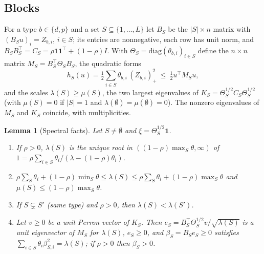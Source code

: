 \documentclass[11pt]{article}
\newtheorem{lemma}{Lemma}
\theoremstyle{definition}
\theoremstyle{remark}
\newcommand{\one}{\mathbf{1}}
\begin{document}
\subsection{Blocks}
For a type $b\in\{d,p\}$ and a set $S\subseteq\{1,\dots,L\}$ let $B_S$ be the $|S|\times n$
matrix with $(B_Su)_i=Z_{b,i}$, $i\in S$; its entries are nonnegative, each row has unit
norm, and $B_SB_S^\top=C_S=\rho\one\one^\top+(1-\rho)I$. With
$\Theta_S=\mathrm{diag}(\theta_{b,i})_{i\in S}$ define the $n\times n$ matrix
$M_S=B_S^\top\Theta_SB_S$, the quadratic forms
\[
h_S(u)=\tfrac12\sum_{i\in S}\theta_{b,i}\,(Z_{b,i})_+^2\ \le\ \tfrac12u^\top M_Su ,
\]
and the scales $\lambda(S)\ge\mu(S)$, the two largest eigenvalues of
$K_S=\Theta_S^{1/2}C_S\Theta_S^{1/2}$ (with $\mu(S)=0$ if $|S|=1$ and
$\lambda(\emptyset)=\mu(\emptyset)=0$). The nonzero eigenvalues of $M_S$ and $K_S$
coincide, with multiplicities.

\begin{lemma}[Spectral facts]\label{lem:spectral}
Let $S\ne\emptyset$ and $\xi=\Theta_S^{1/2}\one$.
\begin{enumerate}
\item[(a)] If $\rho>0$, $\lambda(S)$ is the unique root in
$((1-\rho)\max_{S}\theta,\infty)$ of
$1=\rho\sum_{i\in S}\theta_i/(\lambda-(1-\rho)\theta_i)$.
\item[(b)] $\rho\sum_S\theta_i+(1-\rho)\min_S\theta\le\lambda(S)\le\rho\sum_S\theta_i+(1-\rho)\max_S\theta$
and $\mu(S)\le(1-\rho)\max_S\theta$.
\item[(c)] If $S\subsetneq S'$ (same type) and $\rho>0$, then $\lambda(S)<\lambda(S')$.
\item[(d)] Let $v\ge0$ be a unit Perron vector of $K_S$. Then $e_S=B_S^\top\Theta_S^{1/2}v/\sqrt{\lambda(S)}$
is a unit eigenvector of $M_S$ for $\lambda(S)$, $e_S\ge0$, and $\beta_S=B_Se_S\ge0$
satisfies $\sum_{i\in S}\theta_i\beta_{S,i}^2=\lambda(S)$; if $\rho>0$ then $\beta_S>0$.
\end{enumerate}
\end{lemma}
\end{document}
